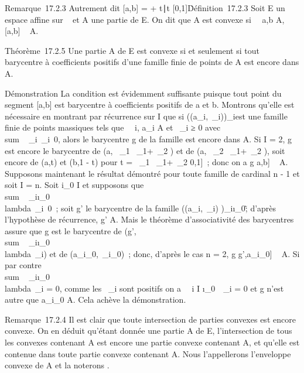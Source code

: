 \documentclass[]{article}
\begin{document}
Remarque~17.2.3 Autrement dit {[}a,b{]} = \a +
t\overrightarrowab∣t \in
{[}0,1{]}\.

Définition~17.2.3 Soit E un espace affine sur ~ et A une partie de E. On
dit que A est convexe si \forall~~a,b \in A, {[}a,b{]} \subset~
A.

Théorème~17.2.5 Une partie A de E est convexe si et seulement si tout
barycentre à coefficients positifs d'une famille finie de points de A
est encore dans A.

Démonstration La condition est évidemment suffisante puisque tout point
du segment {[}a,b{]} est barycentre à coefficients positifs de a et b.
Montrons qu'elle est nécessaire en montrant par récurrence sur
\textbar{}I\textbar{} que si \left
((a\_i,\lambda~\_i)\right )\_i\inI est une
famille finie de points massiques tels que \forall~~i,
a\_i \in A et \lambda~\_i ≥ 0 avec
\\sum ~
\_i\inI\lambda~\_i\neq~0, alors le
barycentre g de la famille est encore dans A. Si \textbar{}I\textbar{} =
2, g est encore le barycentre de (a, \lambda~\_1 \over
\lambda~\_1+\lambda~\_2 ) et de (a, \lambda~\_2
\over \lambda~\_1+\lambda~\_2 ), soit encore de (a,t)
et (b,1 - t) pour t = \lambda~\_1 \over
\lambda~\_1+\lambda~\_2 \in {[}0,1{]}~; donc on a g \in {[}a,b{]} \subset~ A.
Supposons maintenant le résultat démontré pour toute famille de cardinal
n - 1 et soit \textbar{}I\textbar{} = n. Soit i\_0 \in I et
supposons que \\sum ~
\_i\inI\diagdown\i\_0\\lambda~\_i\neq~0~;
soit g' le barycentre de la famille \left
((a\_i,\lambda~\_i)\right
)\_i\inI\diagdown\i\_0\~; d'après
l'hypothèse de récurrence, g' \in A. Mais le théorème d'associativité des
barycentres assure que g est le barycentre de
(g',\\sum ~
\_i\inI\diagdown\i\_0\\lambda~\_i)
et de (a\_i\_0,\lambda~\_i\_0)~; donc, d'après
le cas n = 2, g \in {[}g',a\_i\_0{]} \subset~ A. Si par contre
\\sum ~
\_i\inI\diagdown\i\_0\\lambda~\_i
= 0, comme les \lambda~\_i sont positifs on a
\forall~~i \in I
\diagdown\i\_0\, \lambda~\_i = 0 et g
n'est autre que a\_i\_0 \in A. Cela achève la
démonstration.

Remarque~17.2.4 Il est clair que toute intersection de parties convexes
est encore convexe. On en déduit qu'étant donnée une partie A de E,
l'intersection de tous les convexes contenant A est encore une partie
convexe contenant A, et qu'elle est contenue dans toute partie convexe
contenant A. Nous l'appellerons l'enveloppe convexe de A et la noterons
\hatA.
\end{document}
